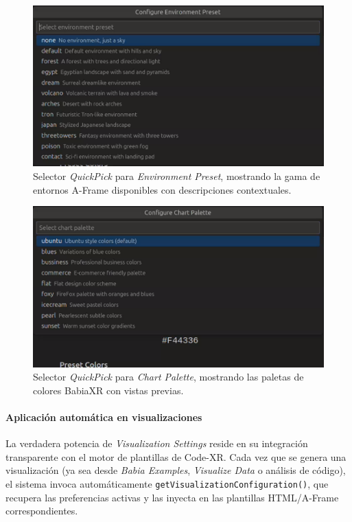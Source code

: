\documentclass[a4paper, 12pt]{book}
\begin{document}
\begin{figure}[H]
\centering
\includegraphics[width=0.70\linewidth]{img/ui-environment-preset-quickpick.png}
\caption{Selector \emph{QuickPick} para \emph{Environment Preset}, mostrando la gama de entornos A-Frame disponibles con descripciones contextuales.}
\label{fig:ui-environment-preset-quickpick}
\end{figure}

\begin{figure}[H]
\centering
\includegraphics[width=0.70\linewidth]{img/ui-chart-palette-quickpick.png}
\caption{Selector \emph{QuickPick} para \emph{Chart Palette}, mostrando las paletas de colores BabiaXR con vistas previas.}
\label{fig:ui-chart-palette-quickpick}
\end{figure}

\paragraph{Aplicación automática en visualizaciones}
La verdadera potencia de \emph{Visualization Settings} reside en su integración transparente con el motor de plantillas de Code-XR. Cada vez que se genera una visualización (ya sea desde \emph{Babia Examples}, \emph{Visualize Data} o análisis de código), el sistema invoca automáticamente \texttt{getVisualizationConfiguration()}, que recupera las preferencias activas y las inyecta en las plantillas HTML/A-Frame correspondientes.
\end{document}
